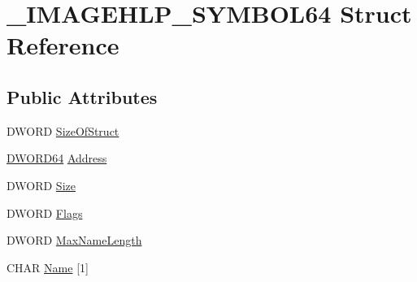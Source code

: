 \hypertarget{struct___i_m_a_g_e_h_l_p___s_y_m_b_o_l64}{\section{\-\_\-\-I\-M\-A\-G\-E\-H\-L\-P\-\_\-\-S\-Y\-M\-B\-O\-L64 Struct Reference}
\label{struct___i_m_a_g_e_h_l_p___s_y_m_b_o_l64}
}
\subsection*{Public Attributes}
\begin{DoxyCompactItemize}
\item 
D\-W\-O\-R\-D \hyperlink{struct___i_m_a_g_e_h_l_p___s_y_m_b_o_l64_a8c1bc2605fd959caf0c66bb8514a2748}{Size\-Of\-Struct}
\item 
\hyperlink{_stack_walker_8h_a97fb241c597b99bcb965858f53cacac4}{D\-W\-O\-R\-D64} \hyperlink{struct___i_m_a_g_e_h_l_p___s_y_m_b_o_l64_a40225e365f7b6be12aded716d1274052}{Address}
\item 
D\-W\-O\-R\-D \hyperlink{struct___i_m_a_g_e_h_l_p___s_y_m_b_o_l64_a2e161070e214274e315ee0461dd0b17b}{Size}
\item 
D\-W\-O\-R\-D \hyperlink{struct___i_m_a_g_e_h_l_p___s_y_m_b_o_l64_a2655b60367f6a33048ba20f5bbbf6e21}{Flags}
\item 
D\-W\-O\-R\-D \hyperlink{struct___i_m_a_g_e_h_l_p___s_y_m_b_o_l64_a3dca0c5048b9366f333fcfffbaf1b03f}{Max\-Name\-Length}
\item 
C\-H\-A\-R \hyperlink{struct___i_m_a_g_e_h_l_p___s_y_m_b_o_l64_ada6f89a1f071aceaf323c39192e68eec}{Name} \mbox{[}1\mbox{]}
\end{DoxyCompactItemize}


